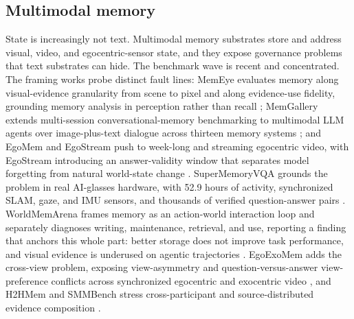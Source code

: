\subsection{Multimodal memory}

State is increasingly not text. Multimodal memory substrates store and address visual, video, and egocentric-sensor state, and they expose governance problems that text substrates can hide. The benchmark wave is recent and concentrated. The framing works probe distinct fault lines: MemEye evaluates memory along visual-evidence granularity from scene to pixel and along evidence-use fidelity, grounding memory analysis in perception rather than recall \citep{guo2026memeye}; MemGallery extends multi-session conversational-memory benchmarking to multimodal LLM agents over image-plus-text dialogue across thirteen memory systems \citep{bei2026memgallery}; and EgoMem and EgoStream push to week-long and streaming egocentric video, with EgoStream introducing an answer-validity window that separates model forgetting from natural world-state change \citep{wang2026egomemreason,forte2026egostream}. SuperMemoryVQA grounds the problem in real AI-glasses hardware, with 52.9 hours of activity, synchronized SLAM, gaze, and IMU sensors, and thousands of verified question-answer pairs \citep{alam2026supermemoryvqa}. WorldMemArena frames memory as an action-world interaction loop and separately diagnoses writing, maintenance, retrieval, and use, reporting a finding that anchors this whole part: better storage does not improve task performance, and visual evidence is underused on agentic trajectories \citep{liu2026worldmemarena}. EgoExoMem adds the cross-view problem, exposing view-asymmetry and question-versus-answer view-preference conflicts across synchronized egocentric and exocentric video \citep{liu2026egoexomem}, and H2HMem and SMMBench stress cross-participant and source-distributed evidence composition \citep{zhu2026h2hmem,chai2026smmbench}.


